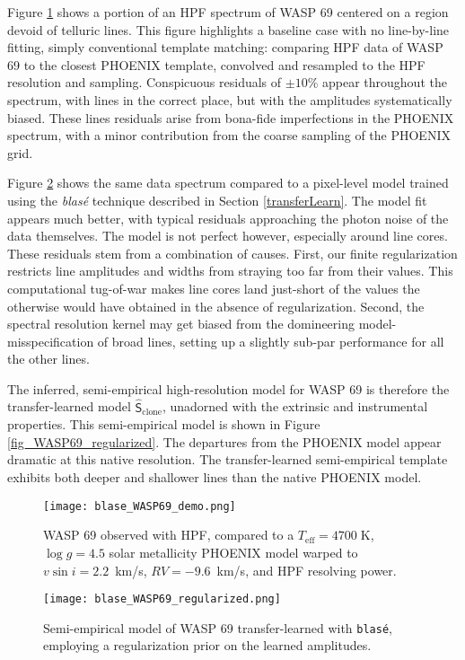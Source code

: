 \documentclass[trackchanges]{aastex631}
\begin{document}
Figure \ref{fig_WASP69_demo} shows a portion of an HPF spectrum of WASP 69 centered on a region devoid of telluric lines.  This figure highlights a baseline case with no line-by-line fitting, simply conventional template matching: comparing HPF data of WASP 69 to the closest PHOENIX template, convolved and resampled to the HPF resolution and sampling.  Conspicuous residuals of $\pm10\%$ appear throughout the spectrum, with lines in the correct place, but with the amplitudes systematically biased.  These lines residuals arise from bona-fide imperfections in the PHOENIX spectrum, with a minor contribution from the coarse sampling of the PHOENIX grid.

Figure \ref{fig_WASP69_transferred} shows the same data spectrum compared to a pixel-level model trained using the \emph{blas\'e} technique described in Section \ref{transferLearn}.  The model fit appears much better, with typical residuals approaching the photon noise of the data themselves.  The model is not perfect however, especially around line cores.  These residuals stem from a combination of causes.  First, our finite regularization restricts line amplitudes and widths from straying too far from their values.  This computational tug-of-war makes line cores land just-short of the values the otherwise would have obtained in the absence of regularization.  Second, the spectral resolution kernel may get biased from the domineering model-misspecification of broad lines, setting up a slightly sub-par performance for all the other lines.

The inferred, semi-empirical high-resolution model for WASP 69 is therefore the transfer-learned model $\mathsf{\hat{S}}_\mathrm{clone}$, unadorned with the extrinsic and instrumental properties.  This semi-empirical model is shown in Figure \ref{fig_WASP69_regularized}.  The departures from the PHOENIX model appear dramatic at this native resolution.  The transfer-learned semi-empirical template exhibits both deeper and shallower lines than the native PHOENIX model.


\begin{figure}[hbt!]
    \centering
    \texttt{[image: blase\_WASP69\_demo.png]}
    \caption{WASP 69 observed with HPF, compared to a $T_{\mathrm{eff}}=4700\;$K,  $\log{g}=4.5$ solar metallicity PHOENIX model warped to $v\sin{i}=2.2$~km/s, $RV=-9.6$~km/s, and HPF resolving power.}
    \label{fig_WASP69_demo}
\end{figure}

\begin{figure}[hbt!]
    \centering
    \texttt{[image: blase\_WASP69\_regularized.png]}
    \caption{Semi-empirical model of WASP 69 transfer-learned with \texttt{blas\'e}, employing a regularization prior on the learned amplitudes.}
    \label{fig_WASP69_transferred}
\end{figure}
\end{document}
